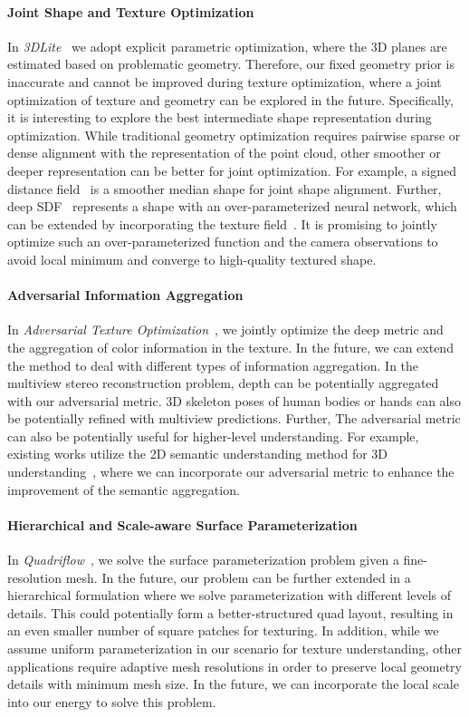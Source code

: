 \paragraph*{Joint Shape and Texture Optimization} In \emph{3DLite}~\cite{huang20173dlite} we adopt explicit parametric optimization, where the 3D planes are estimated based on problematic geometry. Therefore, our fixed geometry prior is inaccurate and cannot be improved during texture optimization, where a joint optimization of texture and geometry can be explored in the future. Specifically, it is interesting to explore the best intermediate shape representation during optimization. While traditional geometry optimization requires pairwise sparse or dense alignment with the representation of the point cloud, other smoother or deeper representation can be better for joint optimization. For example, a signed distance field~\cite{curless1996volumetric} is a smoother median shape for joint shape alignment. Further, deep SDF~\cite{park2019deepsdf} represents a shape with an over-parameterized neural network, which can be extended by incorporating the texture field~\cite{oechsle2019texture}. It is promising to jointly optimize such an over-parameterized function and the camera observations to avoid local minimum and converge to high-quality textured shape.

\paragraph*{Adversarial Information Aggregation} In \emph{Adversarial Texture Optimization}~\cite{huang2020adversarial}, we jointly optimize the deep metric and the aggregation of color information in the texture. In the future, we can extend the method to deal with different types of information aggregation. In the multiview stereo reconstruction problem, depth can be potentially aggregated with our adversarial metric. 3D skeleton poses of human bodies or hands can also be potentially refined with multiview predictions. Further, The adversarial metric can also be potentially useful for higher-level understanding. For example, existing works utilize the 2D semantic understanding method for 3D understanding~\cite{dai20183dmv}, where we can incorporate our adversarial metric to enhance the improvement of the semantic aggregation. 

\paragraph*{Hierarchical and Scale-aware Surface Parameterization} In \emph{Quadriflow}~\cite{huang2018quadriflow}, we solve the surface parameterization problem given a fine-resolution mesh. In the future, our problem can be further extended in a hierarchical formulation where we solve parameterization with different levels of details. This could potentially form a better-structured quad layout, resulting in an even smaller number of square patches for texturing. In addition, while we assume uniform parameterization in our scenario for texture understanding, other applications require adaptive mesh resolutions in order to preserve local geometry details with minimum mesh size. In the future, we can incorporate the local scale into our energy to solve this problem.

